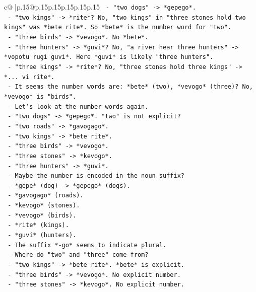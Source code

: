 \documentclass{article}
\begin{document}
{\begin{supertabular}{c@{$\;$}|p{.15\linewidth}@{}p{.15\linewidth}p{.15\linewidth}p{.15\linewidth}p{.15\linewidth}p{.15\linewidth}}
{{{\texttt{     {-} "two dogs" {-}> *gepego*.} \\
\texttt{     {-} "two kings" {-}> *rite*? No, "two kings" in "three stones hold two kings" was *bete rite*. So *bete* is the number word for "two".} \\
\texttt{     {-} "three birds" {-}> *vevogo*. No *bete*.} \\
\texttt{     {-} "three hunters" {-}> *guvi*? No, "a river hear three hunters" {-}> *vopotu rugi guvi*. Here *guvi* is likely "three hunters".} \\
\texttt{     {-} "three kings" {-}> *rite*? No, "three stones hold three kings" {-}> *... vi rite*.} \\
\texttt{     {-} It seems the number words are: *bete* (two), *vevogo* (three)? No, *vevogo* is "birds".} \\
\texttt{     {-} Let's look at the number words again.} \\
\texttt{       {-} "two dogs" {-}> *gepego*. "two" is not explicit?} \\
\texttt{       {-} "two roads" {-}> *gavogago*.} \\
\texttt{       {-} "two kings" {-}> *bete rite*.} \\
\texttt{       {-} "three birds" {-}> *vevogo*.} \\
\texttt{       {-} "three stones" {-}> *kevogo*.} \\
\texttt{       {-} "three hunters" {-}> *guvi*.} \\
\texttt{     {-} Maybe the number is encoded in the noun suffix?} \\
\texttt{       {-} *gepe* (dog) {-}> *gepego* (dogs).} \\
\texttt{       {-} *gavogago* (roads).} \\
\texttt{       {-} *kevogo* (stones).} \\
\texttt{       {-} *vevogo* (birds).} \\
\texttt{       {-} *rite* (kings).} \\
\texttt{       {-} *guvi* (hunters).} \\
\texttt{     {-} The suffix *{-}go* seems to indicate plural.} \\
\texttt{     {-} Where do "two" and "three" come from?} \\
\texttt{       {-} "two kings" {-}> *bete rite*. *bete* is explicit.} \\
\texttt{       {-} "three birds" {-}> *vevogo*. No explicit number.} \\
\texttt{       {-} "three stones" {-}> *kevogo*. No explicit number.} \\
}}}
\end{supertabular}}
\end{document}
